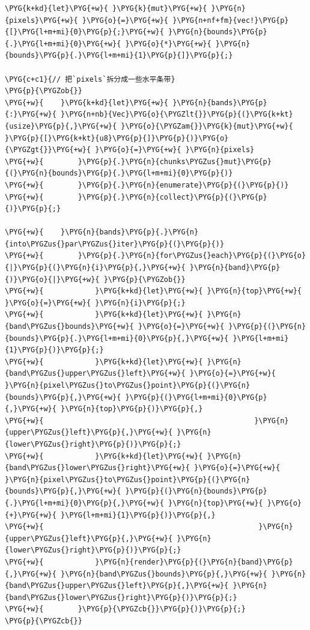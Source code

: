 \begin{Verbatim}[commandchars=\\\{\},breaklines=true,breakanywhere=true,fontsize=\codefont,xleftmargin=17bp]
\PYG{k+kd}{let}\PYG{+w}{ }\PYG{k}{mut}\PYG{+w}{ }\PYG{n}{pixels}\PYG{+w}{ }\PYG{o}{=}\PYG{+w}{ }\PYG{n+nf+fm}{vec!}\PYG{p}{[}\PYG{l+m+mi}{0}\PYG{p}{;}\PYG{+w}{ }\PYG{n}{bounds}\PYG{p}{.}\PYG{l+m+mi}{0}\PYG{+w}{ }\PYG{o}{*}\PYG{+w}{ }\PYG{n}{bounds}\PYG{p}{.}\PYG{l+m+mi}{1}\PYG{p}{]}\PYG{p}{;}

\PYG{c+c1}{// 把`pixels`拆分成一些水平条带}
\PYG{p}{\PYGZob{}}
\PYG{+w}{    }\PYG{k+kd}{let}\PYG{+w}{ }\PYG{n}{bands}\PYG{p}{:}\PYG{+w}{ }\PYG{n+nb}{Vec}\PYG{o}{\PYGZlt{}}\PYG{p}{(}\PYG{k+kt}{usize}\PYG{p}{,}\PYG{+w}{ }\PYG{o}{\PYGZam{}}\PYG{k}{mut}\PYG{+w}{ }\PYG{p}{[}\PYG{k+kt}{u8}\PYG{p}{]}\PYG{p}{)}\PYG{o}{\PYGZgt{}}\PYG{+w}{ }\PYG{o}{=}\PYG{+w}{ }\PYG{n}{pixels}
\PYG{+w}{        }\PYG{p}{.}\PYG{n}{chunks\PYGZus{}mut}\PYG{p}{(}\PYG{n}{bounds}\PYG{p}{.}\PYG{l+m+mi}{0}\PYG{p}{)}
\PYG{+w}{        }\PYG{p}{.}\PYG{n}{enumerate}\PYG{p}{(}\PYG{p}{)}
\PYG{+w}{        }\PYG{p}{.}\PYG{n}{collect}\PYG{p}{(}\PYG{p}{)}\PYG{p}{;}

\PYG{+w}{    }\PYG{n}{bands}\PYG{p}{.}\PYG{n}{into\PYGZus{}par\PYGZus{}iter}\PYG{p}{(}\PYG{p}{)}
\PYG{+w}{        }\PYG{p}{.}\PYG{n}{for\PYGZus{}each}\PYG{p}{(}\PYG{o}{|}\PYG{p}{(}\PYG{n}{i}\PYG{p}{,}\PYG{+w}{ }\PYG{n}{band}\PYG{p}{)}\PYG{o}{|}\PYG{+w}{ }\PYG{p}{\PYGZob{}}
\PYG{+w}{            }\PYG{k+kd}{let}\PYG{+w}{ }\PYG{n}{top}\PYG{+w}{ }\PYG{o}{=}\PYG{+w}{ }\PYG{n}{i}\PYG{p}{;}
\PYG{+w}{            }\PYG{k+kd}{let}\PYG{+w}{ }\PYG{n}{band\PYGZus{}bounds}\PYG{+w}{ }\PYG{o}{=}\PYG{+w}{ }\PYG{p}{(}\PYG{n}{bounds}\PYG{p}{.}\PYG{l+m+mi}{0}\PYG{p}{,}\PYG{+w}{ }\PYG{l+m+mi}{1}\PYG{p}{)}\PYG{p}{;}
\PYG{+w}{            }\PYG{k+kd}{let}\PYG{+w}{ }\PYG{n}{band\PYGZus{}upper\PYGZus{}left}\PYG{+w}{ }\PYG{o}{=}\PYG{+w}{ }\PYG{n}{pixel\PYGZus{}to\PYGZus{}point}\PYG{p}{(}\PYG{n}{bounds}\PYG{p}{,}\PYG{+w}{ }\PYG{p}{(}\PYG{l+m+mi}{0}\PYG{p}{,}\PYG{+w}{ }\PYG{n}{top}\PYG{p}{)}\PYG{p}{,}
\PYG{+w}{                                                 }\PYG{n}{upper\PYGZus{}left}\PYG{p}{,}\PYG{+w}{ }\PYG{n}{lower\PYGZus{}right}\PYG{p}{)}\PYG{p}{;}
\PYG{+w}{            }\PYG{k+kd}{let}\PYG{+w}{ }\PYG{n}{band\PYGZus{}lower\PYGZus{}right}\PYG{+w}{ }\PYG{o}{=}\PYG{+w}{ }\PYG{n}{pixel\PYGZus{}to\PYGZus{}point}\PYG{p}{(}\PYG{n}{bounds}\PYG{p}{,}\PYG{+w}{ }\PYG{p}{(}\PYG{n}{bounds}\PYG{p}{.}\PYG{l+m+mi}{0}\PYG{p}{,}\PYG{+w}{ }\PYG{n}{top}\PYG{+w}{ }\PYG{o}{+}\PYG{+w}{ }\PYG{l+m+mi}{1}\PYG{p}{)}\PYG{p}{,}
\PYG{+w}{                                                  }\PYG{n}{upper\PYGZus{}left}\PYG{p}{,}\PYG{+w}{ }\PYG{n}{lower\PYGZus{}right}\PYG{p}{)}\PYG{p}{;}
\PYG{+w}{            }\PYG{n}{render}\PYG{p}{(}\PYG{n}{band}\PYG{p}{,}\PYG{+w}{ }\PYG{n}{band\PYGZus{}bounds}\PYG{p}{,}\PYG{+w}{ }\PYG{n}{band\PYGZus{}upper\PYGZus{}left}\PYG{p}{,}\PYG{+w}{ }\PYG{n}{band\PYGZus{}lower\PYGZus{}right}\PYG{p}{)}\PYG{p}{;}
\PYG{+w}{        }\PYG{p}{\PYGZcb{}}\PYG{p}{)}\PYG{p}{;}
\PYG{p}{\PYGZcb{}}


\end{Verbatim}
